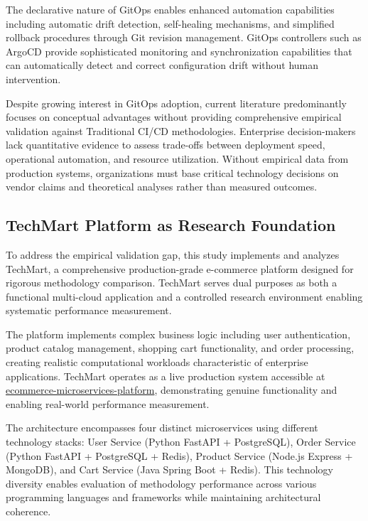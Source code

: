 The declarative nature of GitOps enables enhanced automation capabilities including automatic drift detection, self-healing mechanisms, and simplified rollback procedures through Git revision management. GitOps controllers such as ArgoCD provide sophisticated monitoring and synchronization capabilities that can automatically detect and correct configuration drift without human intervention.

Despite growing interest in GitOps adoption, current literature predominantly focuses on conceptual advantages without providing comprehensive empirical validation against Traditional CI/CD methodologies. Enterprise decision-makers lack quantitative evidence to assess trade-offs between deployment speed, operational automation, and resource utilization. Without empirical data from production systems, organizations must base critical technology decisions on vendor claims and theoretical analyses rather than measured outcomes.

\subsection{TechMart Platform as Research Foundation}
To address the empirical validation gap, this study implements and analyzes TechMart, a comprehensive production-grade e-commerce platform designed for rigorous methodology comparison. TechMart serves dual purposes as both a functional multi-cloud application and a controlled research environment enabling systematic performance measurement.

The platform implements complex business logic including user authentication, product catalog management, shopping cart functionality, and order processing, creating realistic computational workloads characteristic of enterprise applications. TechMart operates as a live production system accessible at \href{https://github.com/kousaila502/ecommerce-microservices-platform}{ecommerce-microservices-platform}, demonstrating genuine functionality and enabling real-world performance measurement.

The architecture encompasses four distinct microservices using different technology stacks: User Service (Python FastAPI + PostgreSQL), Order Service (Python FastAPI + PostgreSQL + Redis), Product Service (Node.js Express + MongoDB), and Cart Service (Java Spring Boot + Redis). This technology diversity enables evaluation of methodology performance across various programming languages and frameworks while maintaining architectural coherence.

